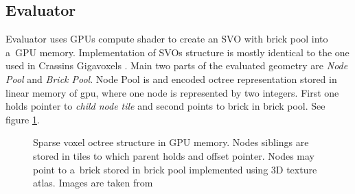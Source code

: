 \documentclass[11pt, a4paper]{article}
\begin{document}
\subsection{Evaluator}
Evaluator uses GPUs compute shader to create an SVO with brick pool into a~GPU memory.
Implementation of SVOs structure is mostly identical to the one used in Crassins Gigavoxels \cite{crassin2011}.
Main two parts of the evaluated geometry are \emph{Node Pool} and \emph{Brick Pool}.
Node Pool is and encoded octree representation stored in linear memory of gpu, where one node is represented by two integers. First one holds pointer to \emph{child node tile} and second points to brick in brick pool. See figure \ref{fig_note_tree}.
\begin{figure}[ht!]
    \centering
    \hspace*{.2in}
    \caption{
        Sparse voxel octree structure in GPU memory.
        Nodes siblings are stored in tiles to which parent holds and offset pointer.
        Nodes may point to a~brick stored in brick pool implemented using 3D texture atlas.
        Images are taken from \cite{crassin2011}
    }
    \label{fig_note_tree}
\end{figure}
\end{document}
